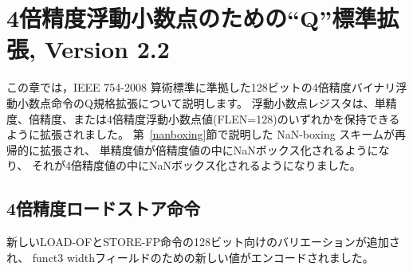 \begin{comment}
\chapter{``Q'' Standard Extension for Quad-Precision Floating-Point,
  Version 2.2}
\end{comment}
\chapter{4倍精度浮動小数点のための``Q''標準拡張, Version 2.2}

\begin{comment}
This chapter describes the Q standard extension for 128-bit quad-precision binary
floating-point instructions compliant with the IEEE 754-2008
arithmetic standard. The quad-precision binary
floating-point instruction-set extension is named ``Q''; it depends
on the double-precision floating-point extension D.
The floating-point registers are now extended to hold either
a single, double, or quad-precision floating-point value (FLEN=128).
The NaN-boxing scheme described in Section~\ref{nanboxing} is now
extended recursively to allow a single-precision value to be NaN-boxed
inside a double-precision value which is itself NaN-boxed inside a
quad-precision value.
\end{comment}

この章では，IEEE 754-2008 算術標準に準拠した128ビットの4倍精度バイナリ浮動小数点命令のQ規格拡張について説明します。
浮動小数点レジスタは、単精度、倍精度、または4倍精度浮動小数点値(FLEN=128)のいずれかを保持できるように拡張されました。
第~\ref{nanboxing}節で説明した NaN-boxing スキームが再帰的に拡張され、
単精度値が倍精度値の中にNaNボックス化されるようになり、
それが4倍精度値の中にNaNボックス化されるようになりました。

\begin{comment}
\section{Quad-Precision Load and Store Instructions}
\end{comment}
\section{4倍精度ロードストア命令}

\begin{comment}
New 128-bit variants of LOAD-FP and STORE-FP instructions are added,
encoded with a new value for the funct3 width field.
\end{comment}
新しいLOAD-OFとSTORE-FP命令の128ビット向けのバリエーションが追加され、
funct3 widthフィールドのための新しい値がエンコードされました。

